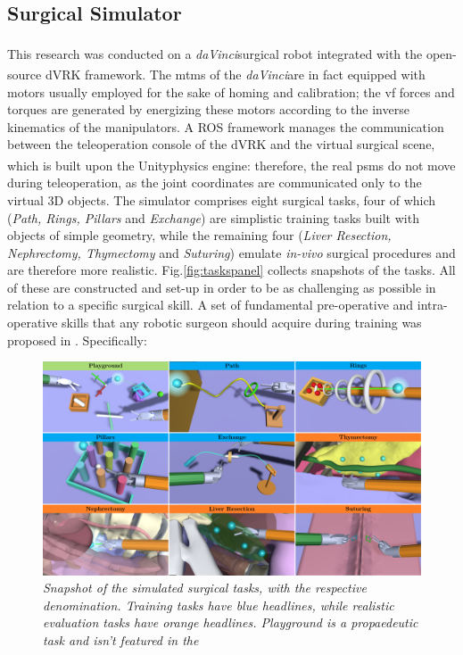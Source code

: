 \documentclass{article}
\newcommand{\cright}{\textsuperscript{\textregistered}\phantom{..}}
\begin{document}
\begin{multicols}{2}
\subsection{Surgical Simulator}
This research was conducted on a \textit{daVinci}\cright surgical robot integrated with the open-source dVRK \cite{Kazanzidesf2014} framework. The \acp{mtm} of the \textit{daVinci}\cright are in fact equipped with motors usually employed for the sake of homing and calibration; the \ac{vf} forces and torques are generated by energizing these motors according to the inverse kinematics of the manipulators. A ROS framework manages the communication between the teleoperation console of the dVRK and the virtual surgical scene, which is built upon the Unity\cright physics engine: therefore, the real \acp{psm} do not move during teleoperation, as the joint coordinates are communicated only to the virtual 3D objects.\newline
The simulator comprises eight surgical tasks, four of which (\textit{Path, Rings, Pillars} and \textit{Exchange}) are simplistic training tasks built with objects of simple geometry, while the remaining four (\textit{Liver Resection, Nephrectomy, Thymectomy} and \textit{Suturing}) emulate \textit{in-vivo} surgical procedures and are therefore more realistic. Fig.\ref{fig:taskspanel} collects snapshots of the tasks. All of these are constructed and set-up in order to be as challenging as possible in relation to a specific surgical skill. A set of fundamental pre-operative and intra-operative skills that any robotic surgeon should acquire during training was proposed in \cite{Smith2014}. Specifically:
\begin{figure}
  \centering
      \includegraphics[width=\linewidth]{images/PANEL_named.png}
      \caption{\small{\textit{Snapshot of the simulated surgical tasks, with the respective denomination. Training tasks have blue headlines, while realistic evaluation tasks have orange headlines. \textit{Playground} is a propaedeutic task and isn't featured in the}}}

\end{figure}
\end{multicols}
\end{document}
